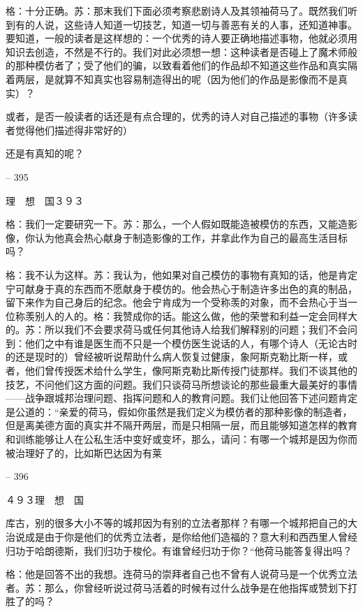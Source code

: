 \documentclass[11pt,oneside]{book}
\begin{document}
\begin{common-format}
    格：十分正确。苏：那末我们下面必须考察悲剧诗人及其领袖荷马了。既然我们听到有的人说，这些诗人知道一切技艺，知道一切与善恶有关的人事，还知道神事。要知道，一般的读者是这样想的：一个优秀的诗人要正确地描述事物，他就必须用知识去创造，不然是不行的。我们对此必须想一想：这种读者是否碰上了魔术师般的那种模仿者了；受了他们的骗，以致看着他们的作品却不知道这些作品和真实隔着两层，是就算不知真实也容易制造得出的呢（因为他们的作品是影像而不是真实）？

    或者，是否一般读者的话还是有点合理的，优秀的诗人对自己描述的事物（许多读者觉得他们描述得非常好的）

    还是有真知的呢？

    

-- 395

    理　想　国３９３

    格：我们一定要研究一下。苏：那么，一个人假如既能造被模仿的东西，又能造影像，你认为他真会热心献身于制造影像的工作，并拿此作为自己的最高生活目标吗？

    格：我不认为这样。苏：我认为，他如果对自己模仿的事物有真知的话，他是肯定宁可献身于真的东西而不愿献身于模仿的。他会热心于制造许多出色的真的制品，留下来作为自己身后的纪念。他会宁肯成为一个受称羡的对象，而不会热心于当一位称羡别人的人的。格：我赞成你的话。能这么做，他的荣誉和利益一定会同样大的。苏：所以我们不会要求荷马或任何其他诗人给我们解释别的问题；我们不会问到：他们之中有谁是医生而不只是一个模仿医生说话的人，有哪个诗人（无论古时的还是现时的）曾经被听说帮助什么病人恢复过健康，象阿斯克勒比斯一样，或者，他们曾传授医术给什么学生，像阿斯克勒比斯传授门徒那样。我们不谈其他的技艺，不问他们这方面的问题。我们只谈荷马所想谈论的那些最重大最美好的事情——战争跟城邦治理问题、指挥问题和人的教育问题。我们让他回答下述问题肯定是公道的：“亲爱的荷马，假如你虽然是我们定义为模仿者的那种影像的制造者，但是离美德方面的真实并不隔开两层，而是只相隔一层，而且能够知道怎样的教育和训练能够让人在公私生活中变好或变坏，那么，请问：有哪一个城邦是因为你而被治理好了的，比如斯巴达因为有莱

    

-- 396

    ４９３理　想　国

    库古，别的很多大小不等的城邦因为有别的立法者那样？有哪一个城邦把自己的大治说成是由于你是他们的优秀立法者，是你给他们造福的？意大利和西西里人曾经归功于哈朗德斯，我们归功于梭伦。有谁曾经归功于你？“他荷马能答复得出吗？

    格：他是回答不出的我想。连荷马的崇拜者自己也不曾有人说荷马是一个优秀立法者。苏：那么，你曾经听说过荷马活着的时候有过什么战争是在他指挥或赞划下打胜了的吗？


\end{common-format}
\end{document}
